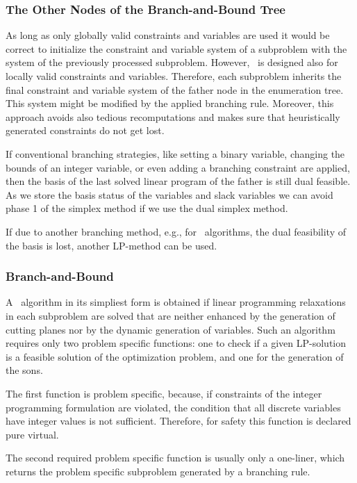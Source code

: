 \subsubsection{The Other Nodes of the Branch-and-Bound Tree}

As long as only globally valid constraints and variables are used it
would be correct
to initialize the constraint and variable system of a subproblem
with the system of the previously processed subproblem. However, \ABACUS\
is designed also for locally valid constraints and variables. Therefore,
each subproblem inherits the final constraint and variable system of 
the father node in the enumeration tree. This system might be modified
by the applied branching rule.
Moreover, this approach
avoids also tedious recomputations  and makes sure that heuristically
generated constraints do not get lost.

If conventional branching strategies, like setting a binary variable,
changing the bounds of an integer variable, or even adding a branching
constraint are applied, then the basis of the last solved linear program
of the father is still dual feasible. As we store the basis
status of the variables and slack variables we can avoid phase 1 of the
simplex method if we use the dual simplex method.

If due to another branching method, e.g., for \bap\ algorithms, the
dual feasibility of the basis is lost, another LP-method can be used.

\subsubsection{Branch-and-Bound}

A \lpbab\ algorithm in its simpliest form is obtained if linear programming
relaxations in each subproblem are solved that are neither enhanced by
the generation of cutting planes nor by the dynamic generation of variables.
Such an algorithm requires only two problem specific functions: one to
check if a given LP-solution is a feasible solution of the 
optimization problem, and one for the generation of the
sons. 

The first function is problem specific, because, if constraints
of the integer programming formulation are violated, the condition
that all discrete variables have integer values is not sufficient.
Therefore, for safety this function is declared pure virtual.

The second required problem specific function is usually only a one-liner, 
which returns the problem specific subproblem generated by a branching
rule.

